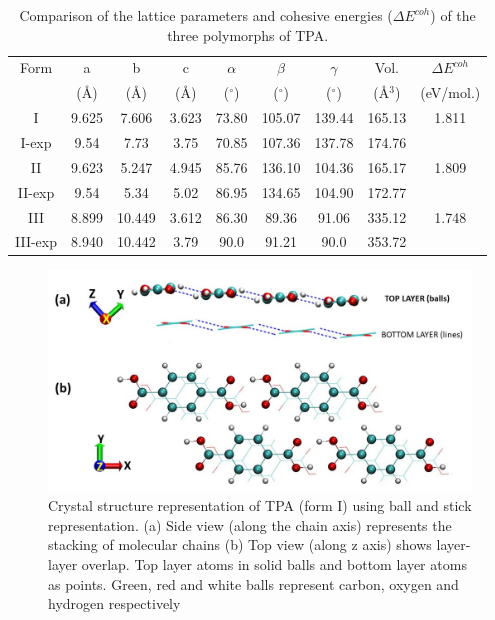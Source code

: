 \begin{table}
    \centering
    \begin{tabular}{|*{9}{c|}}
     \hline
     Form & a& b & c& $\alpha$ & $\beta$ & $\gamma$ & Vol.&$\Delta E^{coh}$\\ 
           & (\AA)& (\AA) & (\AA)& ($^{\circ}$) & ($^{\circ}$) & ($^{\circ}$) & (\AA$^3$) &(eV/mol.)\\ \hline
        I & 9.625 & 7.606 & 3.623 & 73.80 & 105.07 & 139.44 & 165.13&1.811 \\
        I-exp\cite{bailey1967crystal}& 9.54 & 7.73 & 3.75 & 70.85 & 107.36 & 137.78 & 174.76& \\ \hline
               
        II & 9.623 & 5.247 &  4.945 & 85.76 & 136.10 & 104.36 & 165.17&1.809 \\
        II-exp\cite{bailey1967crystal}& 9.54 & 5.34 & 5.02 & 86.95 & 134.65 & 104.90 & 172.77& \\ \hline

        III &  8.899 & 10.449 & 3.612 & 86.30 & 89.36 & 91.06& 335.12&1.748 \\ 
        III-exp\cite{sledz2001new}& 8.940& 10.442 & 3.79 & 90.0 & 91.21 & 90.0 & 353.72& \\ \hline

    \end{tabular}
    \caption{Comparison of the lattice parameters and cohesive energies ($\Delta E^{coh}$) of the three polymorphs of TPA.}
    \label{tab:0K_str}
\end{table}

\begin{figure}
    \centering
    \includegraphics[width=15cm ]{./Appendix4/new_figures_si/figure0.jpg}
    \caption{Crystal structure representation of TPA (form I) using ball and stick representation. (a) Side view (along the chain axis) represents the stacking of molecular chains (b) Top view (along z axis) shows layer-layer overlap. Top layer atoms in solid balls and bottom layer atoms as points. Green, red and white balls represent carbon, oxygen and hydrogen respectively}
    \label{fig:cip0}
\end{figure}

